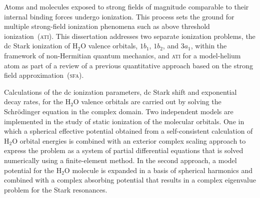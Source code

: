 





Atoms and molecules exposed to strong fields of magnitude comparable
to their internal binding forces undergo ionization. This process sets
the ground for multiple strong-field ionization phenomena such as
above threshold ionization~(\textsc{ati}).
This dissertation addresses two separate ionization problems, the dc
Stark ionization of H$_{2}$O valence orbitals, $1b_{1}$, $1b_{2}$, and
$3a_{1}$, within the framework of non-Hermitian quantum mechanics, and
\textsc{ati} for a model-helium atom as part of a review of a previous
quantitative approach based on the strong field
approximation~(\textsc{sfa}).


Calculations of the dc ionization parameters, dc Stark shift and
exponential decay rates, for the H$_{2}$O valence orbitals are carried
out by solving the Schr\"{o}dinger equation in the complex domain. Two
independent models are implemented in the study of static ionization
of the molecular orbitals. One in which a spherical effective
potential obtained from a self-consistent calculation of H$_{2}$O
orbital energies is combined with an exterior complex scaling approach
to express the problem as a system of partial differential equations
that is solved numerically using a finite-element method. In the
second approach, a model potential for the H$_{2}$O molecule is
expanded in a basis of spherical harmonics and combined with a complex
absorbing potential that results in a complex eigenvalue problem for
the Stark resonances.

